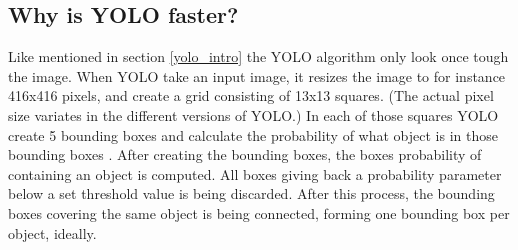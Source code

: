 \subsection{Why is YOLO faster?}
Like mentioned in section \ref{yolo_intro} the YOLO algorithm only look once tough the image. When YOLO take an input image, it resizes the image to for instance 416x416 pixels, and create a grid consisting of 13x13 squares. (The actual pixel size variates in the different versions of YOLO.) In each of those squares YOLO create 5 bounding boxes and calculate the probability of what object is in those bounding boxes \cite{YOLOv2}. After creating the bounding boxes, the boxes probability of containing an object is computed. All boxes giving back a probability parameter below a set threshold value is being discarded. After this process, the bounding boxes covering the same object is being connected, forming one bounding box per object, ideally. 